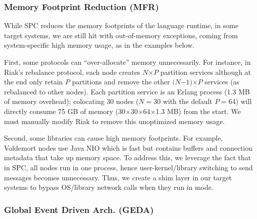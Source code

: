 \subsubsection{Memory Footprint Reduction (MFR)}
\label{sc-mfr}

While SPC reduces the memory footprints of the language runtime, in some
target systems, we are still hit with out-of-memory exceptions, coming
from system-specific high memory usage, as in the examples below.

First, some protocols can ``over-allocate'' memory unnecessarily.
%
For instance, in Riak's rebalance protocol, each node creates
$N$$\times$$P$ partition services although at the end only retain $P$
partitions and remove the other $(N$$-$$1)$$\times$$P$ services (as
rebalanced to other nodes).
%
Each partition service is an Erlang process (1.3 MB of memory overhead);
colocating 30 nodes ($N$$=$30 with the default $P$$=$64) will directly
consume 75 GB of memory (30$\times$30$\times$64$\times$1.3 MB) from the
start.
%
We must manually modify Riak to remove this unoptimized memory usage.


Second, some libraries can cause high memory footprints.  For example,
Voldemort nodes use Java NIO \cite{VoldemortNIO} which is fast but
contains buffers and connection metadata that take up memory space.
%
To address this, we leverage the fact that in SPC, all nodes run in one
process, hence user-kernel/library switching to send messages becomes
unnecessary.  Thus, we create a shim layer in our target systems to bypass
OS/library network calls when they run in \stest mode.






\subsubsection{Global Event Driven Arch. (GEDA)}
\label{sc-geda}


